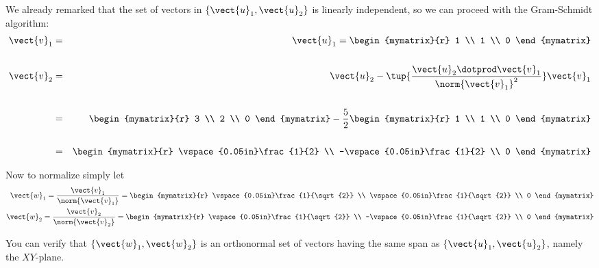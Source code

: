 \begin{solution}
We already remarked that the set of vectors in $\{\vect{u}_1,
\vect{u}_2\}$ is linearly independent, so we can proceed with the
Gram-Schmidt algorithm:
\begin{eqnarray*}
\vect{v}_1 &=& \vect{u}_1 =  \begin{mymatrix}{r}
1 \\
1 \\
0
\end{mymatrix} \\
&& \\
\vect{v}_{2} &=& \vect{u}_{2} - \tup{\dfrac{\vect{u}_2 \dotprod \vect{v}_1}{\norm{\vect{v}_1}^2} }  \vect{v}_1\\ 
&& \\
&=& \begin{mymatrix}{r}
3 \\
2 \\
0
\end{mymatrix}
- 
\frac{5}{2} 
 \begin{mymatrix}{r}
1 \\
1 \\
0
\end{mymatrix} \\
&&\\
&=&  \begin{mymatrix}{r}
\vspace{0.05in}\frac{1}{2} \\
-\vspace{0.05in}\frac{1}{2} \\
0
\end{mymatrix} 
\end{eqnarray*}

Now to normalize simply let 
\begin{eqnarray*}
\vect{w}_1  = \frac{\vect{v}_1}{\norm{\vect{v}_1}}  = \begin{mymatrix}{r}
\vspace{0.05in}\frac{1}{\sqrt{2}}  \\
\vspace{0.05in}\frac{1}{\sqrt{2}} \\
0
\end{mymatrix} \\
\vect{w}_2  = \frac{\vect{v}_2}{\norm{\vect{v}_2}}  = \begin{mymatrix}{r}
\vspace{0.05in}\frac{1}{\sqrt{2}}  \\
-\vspace{0.05in}\frac{1}{\sqrt{2}} \\
 0
\end{mymatrix}
\end{eqnarray*}

You can verify that $\{\vect{w}_1, \vect{w}_2\}$ is an orthonormal set of vectors  having the same span as
$\{\vect{u}_1, \vect{u}_2\}$,  namely the $XY$-plane.
\end{solution}


